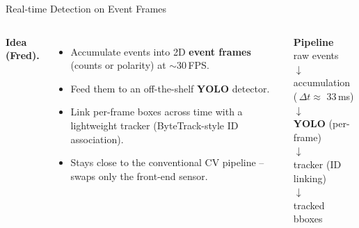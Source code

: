 \documentclass[aspectratio=169,11pt]{beamer}
\begin{document}
\begin{frame}{Real-time Detection on Event Frames}
  \vspace{0.3em}
  \begin{columns}[T,onlytextwidth]
    \textbf{Idea (Fred).}
    \begin{itemize}
      \setlength\itemsep{0.4em}
      \item Accumulate events into 2D \textbf{event frames} (counts or polarity) at $\sim$30\,FPS.
      \item Feed them to an off-the-shelf \textbf{YOLO} detector.
      \item Link per-frame boxes across time with a lightweight tracker
            (ByteTrack-style ID association).
      \item Stays close to the conventional CV pipeline -- swaps only the front-end sensor.
    \end{itemize}

    \begin{darkbox}
      \centering
      \textbf{Pipeline}\\[0.5em]
      raw events\\
      \;$\downarrow$\\
      accumulation (\,$\Delta t \approx$ 33\,ms)\\
      \;$\downarrow$\\
      \textbf{YOLO} (per-frame)\\
      \;$\downarrow$\\
      tracker (ID linking)\\
      \;$\downarrow$\\
      tracked bboxes
    \end{darkbox}
  \end{columns}
\end{frame}
\end{document}
